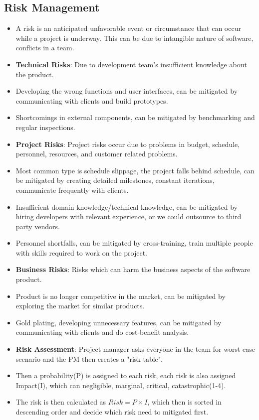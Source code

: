 \documentclass[a4paper]{article}
\begin{document}
\subsection{Risk Management}
\begin{itemize}
    \item A risk is an anticipated unfavorable event or circumstance that can occur while a project is underway. This can be due to intangible nature of software, conflicts in a team.
    \item \textbf{Technical Risks}: Due to development team's insufficient knowledge about the product.
    \item Developing the wrong functions and user interfaces, can be mitigated by communicating with clients and build prototypes.
    \item Shortcomings in external components, can be mitigated by benchmarking and regular inspections.
    \item \textbf{Project Risks}: Project risks occur due to problems in budget, schedule, personnel, resources, and customer related problems.
    \item Most common type is schedule slippage, the project falls behind schedule, can be mitigated by creating detailed milestones, constant iterations, communicate frequently with clients.
    \item Insufficient domain knowledge/technical knowledge, can be mitigated by hiring developers with relevant experience, or we could outsource to third party vendors.
    \item Personnel shortfalls, can be mitigated by cross-training, train multiple people with skills required to work on the project.
    \item \textbf{Business Risks}: Risks which can harm the business aspects of the software product.
    \item Product is no longer competitive in the market, can be mitigated by exploring the market for similar products.
    \item Gold plating, developing unnecessary features, can be mitigated by communicating with clients and do cost-benefit analysis.
    \item \textbf{Risk Assessment}: Project manager asks everyone in the team for worst case scenario and the PM then creates a "risk table".
    \item Then a probability(P) is assigned to each risk, each risk is also assigned Impact(I), which can negligible, marginal, critical, catastrophic(1-4).
    \item The risk is then calculated as $Risk=P\times I$, which then is sorted in descending order and decide which risk need to mitigated first.
\end{itemize}
\end{document}
